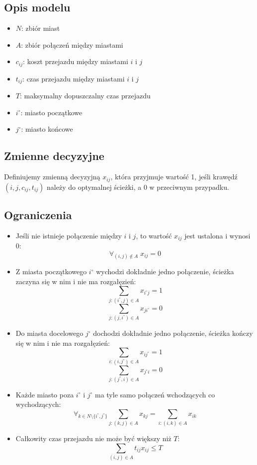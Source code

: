 \documentclass{article}
\begin{document}
\subsection{Opis modelu}
\begin{itemize}
    \item $N$: zbiór miast
    \item $A$: zbiór połączeń między miastami
    \item $c_{ij}$: koszt przejazdu między miastami $i$ i $j$
    \item $t_{ij}$: czas przejazdu między miastami $i$ i $j$
    \item $T$: maksymalny dopuszczalny czas przejazdu
    \item $i^\circ$: miasto początkowe
    \item $j^\circ$: miasto końcowe
\end{itemize}
\subsection{Zmienne decyzyjne}
Definiujemy zmienną decyzyjną $x_{ij}$, która przyjmuje wartość 1, jeśli krawędź $(i, j, c_{ij}, t_{ij})$ należy do optymalnej ścieżki, a 0 w przeciwnym przypadku.
\subsection{Ograniczenia}
\begin{itemize}
    \item Jeśli nie istnieje połączenie między $i$ i $j$, to wartość $x_{ij}$ jest ustalona i wynosi 0:
    \[\forall_{(i, j) \notin A} \; x_{ij} = 0\]
    \item Z miasta początkowego $i^\circ$ wychodzi dokładnie jedno połączenie, ścieżka zaczyna się w nim i nie ma rozgałęzień:
    \[\sum_{j: (i^\circ, j) \in A} x_{i^\circ j} = 1\]
    \[\sum_{j: (j, i^\circ) \in A} x_{ji^\circ} = 0\]
    \item Do miasta docelowego $j^\circ$ dochodzi dokładnie jedno połączenie, ścieżka kończy się w nim i nie ma rozgałęzień:
    \[\sum_{i: (i, j^\circ)\in A} x_{ij^\circ} = 1\]
    \[\sum_{j: (j^\circ, i) \in A} x_{j^\circ i} = 0\]
    \item Każde miasto poza $i^\circ$ i $j^\circ$ ma tyle samo połączeń wchodzących co wychodzących:
    \[\forall_{k \in N \setminus \{i^\circ, j^\circ\}} \sum_{j:(k, j) \in A} x_{kj} = \sum_{i: (i, k) \in A} x_{ik}\]
    \item Całkowity czas przejazdu nie może być większy niż $T$:
    \[\sum_{(i, j) \in A} t_{ij}x_{ij} \leq T\]
\end{itemize}
\end{document}
